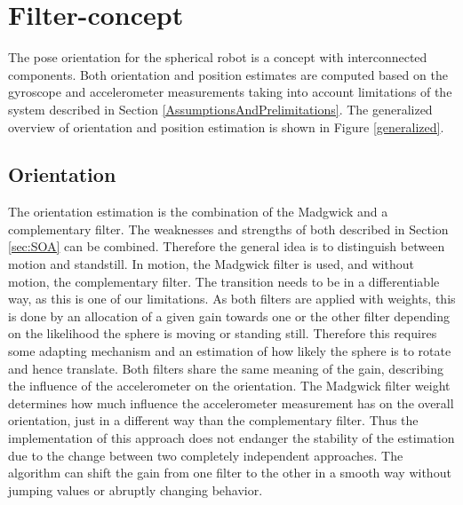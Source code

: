 \documentclass[letterpaper, 10 pt, conference]{ieeeconf}  %
\begin{document}
\section{Filter-concept}
The pose orientation for the spherical robot is a concept with interconnected components.
Both orientation and position estimates are computed based on the gyroscope and accelerometer measurements taking into account limitations of the system described in Section \ref{AssumptionsAndPrelimitations}.
The generalized overview of orientation and position estimation is shown in Figure \ref{generalized}.

\subsection{Orientation}
The orientation estimation is the combination of the Madgwick and a complementary filter.
The weaknesses and strengths of both described in Section \ref{sec:SOA} can be combined. 
Therefore the general idea is to distinguish between motion and standstill.
In motion, the Madgwick filter is used, and without motion, the complementary filter.
The transition needs to be in a differentiable way, as this is one of our limitations.  
As both filters are applied with weights, this is done by an allocation of a given gain towards one or the other filter depending on the likelihood the sphere is moving or standing still. 
Therefore this requires some adapting mechanism and an estimation of how likely the sphere is to rotate and hence translate.
Both filters share the same meaning of the gain, describing the influence of the accelerometer on the orientation.
The Madgwick filter weight determines how much influence the accelerometer measurement has on the overall orientation, just in a different way than the complementary filter.
Thus the implementation of this approach does not endanger the stability of the estimation due to the change between two completely independent approaches.
The algorithm can shift the gain from one filter to the other in a smooth way without jumping values or abruptly changing behavior. 
\end{document}
